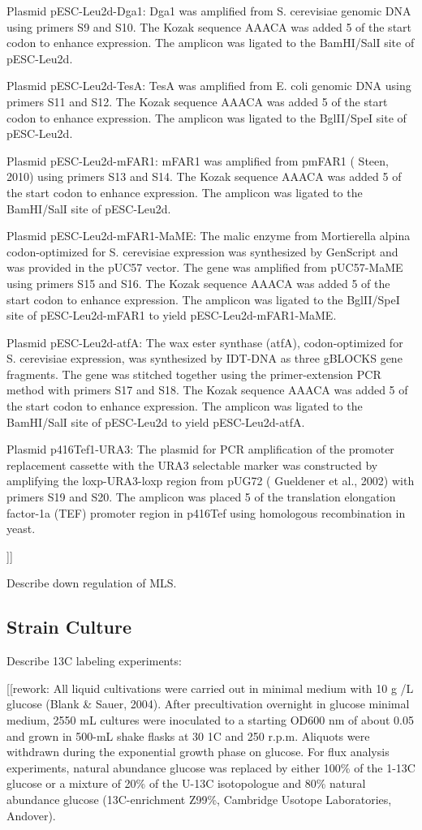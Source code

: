 \documentclass{bmcart}
\begin{document}
Plasmid pESC-Leu2d-Dga1: Dga1 was amplified from S. cerevisiae genomic DNA using primers S9 and S10. The Kozak sequence AAACA was added 5 of the start codon to enhance expression. The amplicon was ligated to the BamHI/SalI site of pESC-Leu2d.

Plasmid pESC-Leu2d-TesA: TesA was amplified from E. coli genomic DNA using primers S11 and S12. The Kozak sequence AAACA was added 5 of the start codon to enhance expression. The amplicon was ligated to the BglII/SpeI site of pESC-Leu2d.

Plasmid pESC-Leu2d-mFAR1: mFAR1 was amplified from pmFAR1 ( Steen, 2010) using primers S13 and S14. The Kozak sequence AAACA was added 5 of the start codon to enhance expression. The amplicon was ligated to the BamHI/SalI site of pESC-Leu2d.

Plasmid pESC-Leu2d-mFAR1-MaME: The malic enzyme from Mortierella alpina codon-optimized for S. cerevisiae expression was synthesized by GenScript and was provided in the pUC57 vector. The gene was amplified from pUC57-MaME using primers S15 and S16. The Kozak sequence AAACA was added 5 of the start codon to enhance expression. The amplicon was ligated to the BglII/SpeI site of pESC-Leu2d-mFAR1 to yield pESC-Leu2d-mFAR1-MaME.

Plasmid pESC-Leu2d-atfA: The wax ester synthase (atfA), codon-optimized for S. cerevisiae expression, was synthesized by IDT-DNA as three gBLOCKS gene fragments. The gene was stitched together using the primer-extension PCR method with primers S17 and S18. The Kozak sequence AAACA was added 5 of the start codon to enhance expression. The amplicon was ligated to the BamHI/SalI site of pESC-Leu2d to yield pESC-Leu2d-atfA.

Plasmid p416Tef1-URA3: The plasmid for PCR amplification of the promoter replacement cassette with the URA3 selectable marker was constructed by amplifying the loxp-URA3-loxp region from pUG72 ( Gueldener et al., 2002) with primers S19 and S20. The amplicon was placed 5 of the translation elongation factor-1a (TEF) promoter region in p416Tef using homologous recombination in yeast.


 ]]


Describe down regulation of MLS.


\subsection*{Strain Culture}
Describe 13C labeling experiments:

[[rework:  
All liquid cultivations were carried out in minimal medium with
10 g /L glucose (Blank \& Sauer, 2004). After precultivation
overnight in glucose minimal medium, 2550 mL cultures
were inoculated to a starting OD600 nm of about 0.05 and
grown in 500-mL shake flasks at 30 1C and 250 r.p.m.
Aliquots were withdrawn during the exponential growth
phase on glucose. For flux analysis experiments, natural
abundance glucose was replaced by either 100\% of the 1-13C
glucose or a mixture of 20\% of the U-13C isotopologue and
80\% natural abundance glucose (13C-enrichment Z99\%,
Cambridge Usotope Laboratories, Andover).
\end{document}
